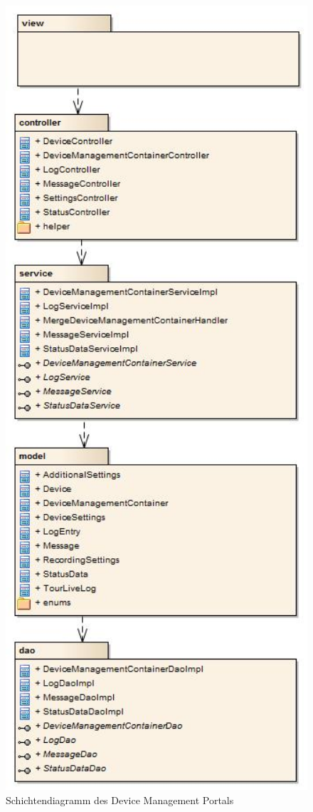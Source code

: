 \begin{figure}[H]
	\centering
	\includegraphics[width=120mm]{images/devmgmtsrv/schichten.jpg}
	\caption{Schichtendiagramm des Device Management Portals}
\end{figure}

